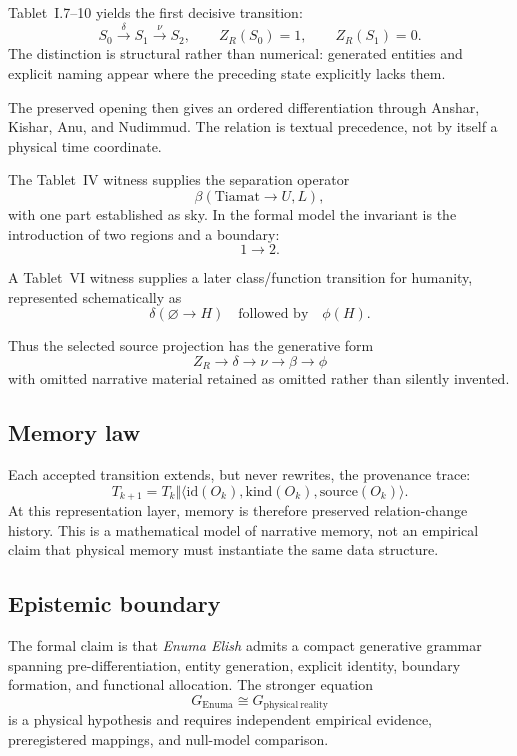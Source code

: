 Tablet~I.7--10 yields the first decisive transition:
\[
S_0\xrightarrow{\delta}S_1\xrightarrow{\nu}S_2,
\qquad
Z_R(S_0)=1,
\qquad
Z_R(S_1)=0.
\]
The distinction is structural rather than numerical: generated entities and
explicit naming appear where the preceding state explicitly lacks them.

The preserved opening then gives an ordered differentiation through Anshar,
Kishar, Anu, and Nudimmud.  The relation is textual precedence, not by itself
a physical time coordinate.

The Tablet~IV witness supplies the separation operator
\[
\beta(\mathrm{Tiamat}\rightarrow U,L),
\]
with one part established as sky.  In the formal model the invariant is the
introduction of two regions and a boundary:
\[
1\longrightarrow2.
\]

A Tablet~VI witness supplies a later class/function transition for humanity,
represented schematically as
\[
\delta(\varnothing\rightarrow H)
\quad\text{followed by}\quad
\phi(H).
\]

Thus the selected source projection has the generative form
\[
\boxed{
Z_R
\longrightarrow
\delta
\longrightarrow
\nu
\longrightarrow
\beta
\longrightarrow
\phi
}
\]
with omitted narrative material retained as omitted rather than silently
invented.

\subsection{Memory law}

Each accepted transition extends, but never rewrites, the provenance trace:
\[
T_{k+1}
=
T_k\Vert
\langle
\mathrm{id}(O_k),
\mathrm{kind}(O_k),
\mathrm{source}(O_k)
\rangle.
\]
At this representation layer, memory is therefore preserved relation-change
history.  This is a mathematical model of narrative memory, not an empirical
claim that physical memory must instantiate the same data structure.

\subsection{Epistemic boundary}

The formal claim is that \emph{Enuma Elish} admits a compact generative
grammar spanning pre-differentiation, entity generation, explicit identity,
boundary formation, and functional allocation.  The stronger equation
\[
G_{\mathrm{Enuma}}
\cong
G_{\mathrm{physical\ reality}}
\]
is a physical hypothesis and requires independent empirical evidence,
preregistered mappings, and null-model comparison.

